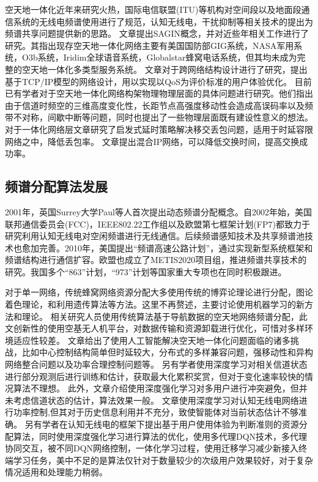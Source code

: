空天地一体化近年来研究火热，国际电信联盟(ITU)等机构对空间段以及地面段通信系统的无线电频谱使用进行了规范，认知无线电，干扰抑制等相关技术的提出为频谱共享问题提供新的思路。
文章\cite{8368236}提出SAGIN概念，并对近些年相关工作进行了研究。其指出现存空天地一体化网络主要有美国国防部GIG系统，NASA军用系统，O3b系统，Iridim全球语音系统，Globalstar蜂窝电话系统，但其均未成为完整的空天地一体化多类型服务系统。
文章\cite{6587995}对于跨网络结构设计进行了研究，提出基于TCP/IP模型的网络设计，用以实现以QoS为评价标准的用户体验优化。
目前已有学者对于空天地一体化网络构架物理物理层面的具体问题进行研究\cite{7879675}。他们指出由于信道时频空的三维高度变化性，长距节点高强度移动性会造成高误码率以及频带不对称，间歇中断等问题，同时也提出了一些物理层面既有建设性意义的想法。
对于一体化网络层文章\cite{8116396}研究了启发式延时策略解决移交丢包问题，适用于时延容限网络之中，降低丢包率。
文章\cite{7925019}提出混合IP网络，可以降低交换时间，提高交换成功率。


\subsection{频谱分配算法发展}

2001年，英国Surrey大学Paul等人首次提出动态频谱分配概念。自2002年始，美国联邦通信委员会(FCC)，IEEE802.22工作组以及欧盟第七框架计划(FP7)都致力于研究利用认知无线电对空闲频谱进行无线通信。后续频谱感知技术及共享频谱池技术也愈加完善。2010年，美国提出“频谱高速公路计划”，通过实现新型系统框架和频谱结构进行通信扩容。欧盟也成立了METIS2020项目组，推进频谱共享技术的研究。我国多个“863”计划，“973”计划等国家重大专项也在同时积极跟进。

对于单一网络，传统蜂窝网络资源分配\cite{廖晓闽2019基于深度强化学习的蜂窝网资源分配算法}大多使用传统的博弈论理论\cite{6998030}进行分配，图论着色理论\cite{7833211}，和利用遗传算法\cite{8336853}等方法。这里不再赘述，主要讨论使用机器学习的新方法和理论。
相关研究人员\cite{7127619}使用传统算法基于导航数据的空天地网络频谱分配，此文创新性的使用空基无人机平台，对数据传输和资源卸载进行优化，可惜对多样环境适应性较差。
文章\cite{8612450}给出了使用人工智能解决空天地一体化问题面临的诸多挑战，比如中心控制结构简单但时延较大，分布式的多样兼容问题，强移动性和异构网络整合问题以及功率合理控制问题等。
另有学者使用深度学习对相关信道状态进行部分观测后进行训练和估计\cite{8303773}，获取最大化累积奖赏，但对于变化速率较快的情况算法不理想。
此外，文章\cite{8254101}介绍使用深度强化学习对多用户进行冲突避免，但并未考虑信道状态的估计，算法效果一般。
文章\cite{Li2018Intelligent}使用深度学习对认知无线电网络进行功率控制,但其对于历史信息利用并不充分，致使智能体对当前状态估计不够准确。
另有学者\cite{8403658}在认知无线电的框架下提出基于用户使用体验为判断准则的资源分配算法，同时使用深度强化学习进行算法的优化，使用多代理DQN技术，多代理协同交互，被不同DQN网络控制，一体化学习过程，使用迁移学习减少新接入终端学习任务，美中不足的是算法仅针对于数量较少的次级用户效果较好，对于复杂情况适用和处理能力稍弱。


